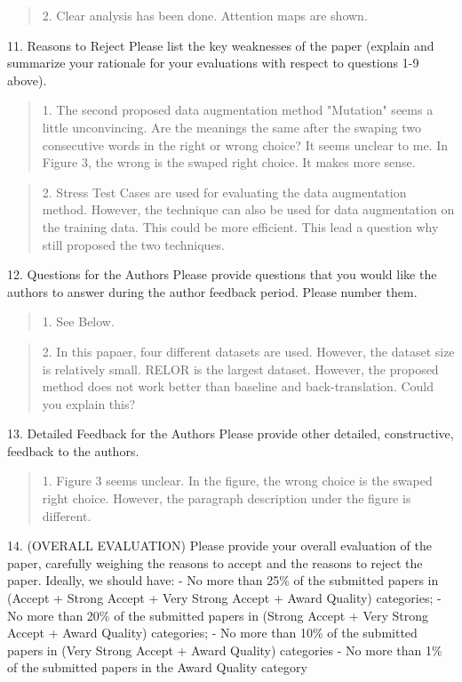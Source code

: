 \documentclass{article}
\begin{document}
\begin{quote}
    2. Clear analysis has been done. Attention maps are shown.
\end{quote}

11. {Reasons to Reject} Please list the key weaknesses of the paper (explain and summarize your rationale for your evaluations with respect to questions 1-9 above).
    
\begin{quote}
    1. The second proposed data augmentation method "Mutation" seems a little unconvincing. Are the meanings the same after the swaping two consecutive words in the right or wrong choice? It seems unclear to me. In Figure 3, the wrong is the swaped right choice. It makes more sense. 
\end{quote}

\begin{quote}
    2. Stress Test Cases are used for evaluating the data augmentation method. However, the technique can also be used for data augmentation on the training data. This could be more efficient. This lead a question why still proposed the two techniques.
\end{quote}

12. {Questions for the Authors} Please provide questions that you would like the authors to answer during the author feedback period. Please number them.
\begin{quote}
1. See Below.
\end{quote}

\begin{quote}
2. In this papaer, four different datasets are used. However, the dataset size is relatively small. RELOR is the largest dataset. However, the proposed method does not work better than baseline and back-translation. Could you explain this?
\end{quote}

13. {Detailed Feedback for the Authors} Please provide other detailed, constructive, feedback to the authors.
\begin{quote}
1. Figure 3 seems unclear. In the figure, the wrong choice is the swaped right choice. However, the paragraph description under the figure is different.
\end{quote}

14. (OVERALL EVALUATION) Please provide your overall evaluation of the paper, carefully weighing the reasons to accept and the reasons to reject the paper. Ideally, we should have: - No more than 25\% 
of the submitted papers in (Accept + Strong Accept + Very Strong Accept + Award Quality) categories; 
- No more than 20\% of the submitted papers in (Strong Accept + 
Very Strong Accept + Award Quality) categories; 
- No more than 10\% of the submitted papers in 
(Very Strong Accept + Award Quality) categories - No more than 1\% 
of the submitted papers in the Award Quality category
\end{document}
